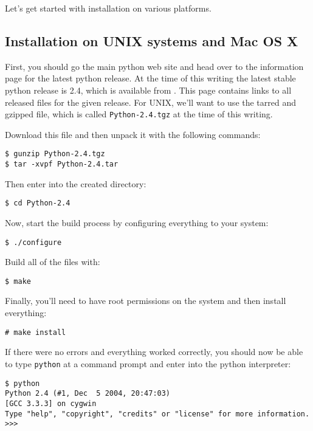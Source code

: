 \documentclass{article}
\begin{document}
Let's get started with installation on various platforms.

\subsection{Installation on UNIX systems and Mac OS X}

First, you should go the main python web site and head over to the information
page for the latest python release. At the time of this writing the
latest stable python release is 2.4, which is available from
. This page contains links
to all released files for the given release. For UNIX, we'll want to use
the tarred and gzipped file, which is called \verb|Python-2.4.tgz| at
the time of this writing.

Download this file and then unpack it with the following commands:

\begin{verbatim}
$ gunzip Python-2.4.tgz 
$ tar -xvpf Python-2.4.tar 
\end{verbatim}

Then enter into the created directory:

\begin{verbatim}
$ cd Python-2.4
\end{verbatim}

Now, start the build process by configuring everything to your system:

\begin{verbatim}
$ ./configure
\end{verbatim}

Build all of the files with:

\begin{verbatim}
$ make
\end{verbatim}

Finally, you'll need to have root permissions on the system and then
install everything:

\begin{verbatim}
# make install
\end{verbatim}

If there were no errors and everything worked correctly, you should now
be able to type \verb|python| at a command prompt and enter into the
python interpreter:

\begin{verbatim}
$ python
Python 2.4 (#1, Dec  5 2004, 20:47:03)
[GCC 3.3.3] on cygwin
Type "help", "copyright", "credits" or "license" for more information.
>>>
\end{verbatim}
\end{document}
